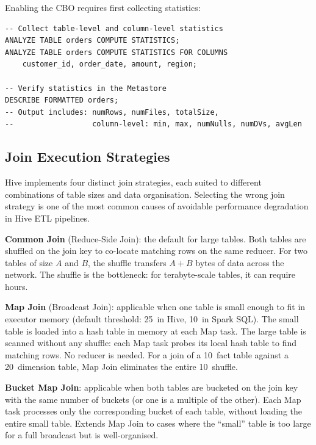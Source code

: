 Enabling the CBO requires first collecting statistics:

\begin{lstlisting}[style=hiveql, caption={Collecting Hive statistics for CBO}]
-- Collect table-level and column-level statistics
ANALYZE TABLE orders COMPUTE STATISTICS;
ANALYZE TABLE orders COMPUTE STATISTICS FOR COLUMNS
    customer_id, order_date, amount, region;

-- Verify statistics in the Metastore
DESCRIBE FORMATTED orders;
-- Output includes: numRows, numFiles, totalSize,
--                  column-level: min, max, numNulls, numDVs, avgLen
\end{lstlisting}

\subsection{Join Execution Strategies}
\label{subsec:join-strategies}

Hive implements four distinct join strategies, each suited to different
combinations of table sizes and data organisation. Selecting the wrong
join strategy is one of the most common causes of avoidable performance
degradation in Hive ETL pipelines.

\textbf{Common Join} (Reduce-Side Join): the default for large tables.
Both tables are shuffled on the join key to co-locate matching rows on
the same reducer. For two tables of size $A$ and $B$, the shuffle
transfers $A + B$ bytes of data across the network. The shuffle is the
bottleneck: for terabyte-scale tables, it can require hours.

\textbf{Map Join} (Broadcast Join): applicable when one table is small
enough to fit in executor memory (default threshold: 25\MB\ in Hive,
10\MB\ in Spark SQL). The small table is loaded into a hash table in
memory at each Map task. The large table is scanned without any shuffle:
each Map task probes its local hash table to find matching rows. No
reducer is needed. For a join of a 10\TB\ fact table against a 20\MB\
dimension table, Map Join eliminates the entire 10\TB\ shuffle.

\textbf{Bucket Map Join}: applicable when both tables are bucketed on
the join key with the same number of buckets (or one is a multiple of
the other). Each Map task processes only the corresponding bucket of each
table, without loading the entire small table. Extends Map Join to
cases where the ``small'' table is too large for a full broadcast but
is well-organised.

